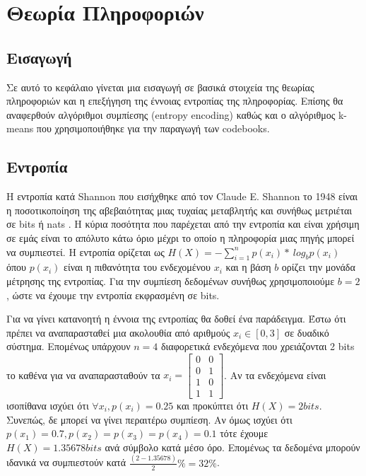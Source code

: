 ﻿\chapter{Θεωρία Πληροφοριών}
\label{chapter:chap3}

\section{Εισαγωγή}
\label{section:sect31}

\indent Σε αυτό το κεφάλαιο γίνεται μια εισαγωγή σε βασικά στοιχεία της θεωρίας πληροφοριών και η επεξήγηση της έννοιας εντροπίας της πληροφορίας. Επίσης θα αναφερθούν αλγόριθμοι συμπίεσης (entropy encoding) καθώς και ο αλγόριθμος k-means που χρησιμοποιήθηκε για την παραγωγή των codebooks.

\section{Εντροπία}
\label{section:sect32}

\indent Η εντροπία κατά Shannon που εισήχθηκε από τον Claude E. Shannon το 1948 είναι η ποσοτικοποίηση της αβεβαιότητας μιας τυχαίας μεταβλητής και συνήθως μετριέται σε bits ή nats \cite{shannon}. Η κύρια ποσότητα που παρέχεται από την εντροπία και είναι χρήσιμη σε εμάς είναι το απόλυτο κάτω όριο μέχρι το οποίο η πληροφορία μιας πηγής μπορεί να συμπιεστεί. Η εντροπία ορίζεται ως $ H(X) = -\sum_{i=1}^{n} p(x_i)*\ log_{b} p(x_i) $  όπου $p(x_i)$ είναι η πιθανότητα του ενδεχομένου $x_i$ και η βάση $b$ ορίζει την μονάδα μέτρησης της εντροπίας. Για την συμπίεση δεδομένων συνήθως χρησιμοποιούμε $b=2$, ώστε να έχουμε την εντροπία εκφρασμένη σε bits.

\indent Για να γίνει κατανοητή η έννοια της εντροπίας θα δοθεί ένα παράδειγμα. Έστω ότι πρέπει να αναπαρασταθεί μια ακολουθία από αριθμούς $x_i \in [0,3] $ σε δυαδικό σύστημα. Επομένως υπάρχουν $n=4$ διαφορετικά ενδεχόμενα που χρειάζονται 2 bits το καθένα για να αναπαρασταθούν τα
$x_i = \begin{bmatrix}
0 & 0 \\
0 & 1 \\
1 & 0 \\
1 & 1
\end{bmatrix} $. Αν τα ενδεχόμενα είναι ισοπίθανα ισχύει ότι $ \forall{x_i}, p(x_i)= 0.25 $ και προκύπτει ότι $ H(X) = 2  bits $. Συνεπώς, δε μπορεί να γίνει περαιτέρω συμπίεση. Αν όμως ισχύει ότι $ p(x_1) = 0.7, p(x_2)=p(x_3)=p(x_4)=0.1 $ τότε έχουμε $ H(X) = 1.35678  bits$ ανά σύμβολο κατά μέσο όρο. Επομένως τα δεδομένα  μπορούν ιδανικά να συμπιεστούν κατά $\frac{(2-1.35678)}{2}\% = 32\%$.

